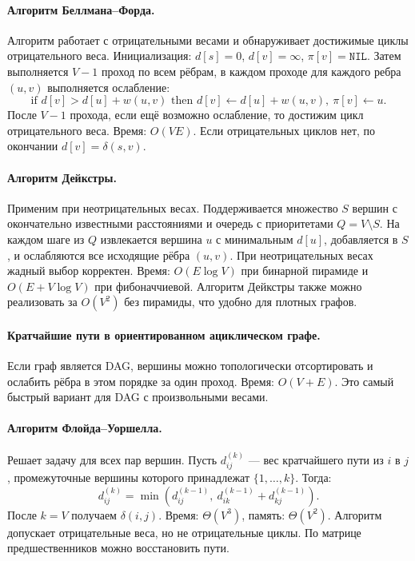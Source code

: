 \documentclass[a4paper,12pt]{article}
\begin{document}
\paragraph*{Алгоритм Беллмана--Форда.}
Алгоритм работает с отрицательными весами и обнаруживает достижимые циклы отрицательного веса. Инициализация: \(d[s]=0\), \(d[v]=\infty\), \(\pi[v]=\texttt{NIL}\). Затем выполняется \(V-1\) проход по всем рёбрам, в каждом проходе для каждого ребра \((u,v)\) выполняется ослабление:
\[
\text{if } d[v]>d[u]+w(u,v)\text{ then } d[v]\leftarrow d[u]+w(u,v),\ \pi[v]\leftarrow u.
\]
После \(V-1\) прохода, если ещё возможно ослабление, то достижим цикл отрицательного веса. Время: \(O(VE)\). Если отрицательных циклов нет, по окончании \(d[v]=\delta(s,v)\).

\paragraph*{Алгоритм Дейкстры.}
Применим при неотрицательных весах. Поддерживается множество \(S\) вершин с окончательно известными расстояниями и очередь с приоритетами \(Q=V\setminus S\). На каждом шаге из \(Q\) извлекается вершина \(u\) с минимальным \(d[u]\), добавляется в \(S\), и ослабляются все исходящие рёбра \((u,v)\). При неотрицательных весах жадный выбор корректен. Время: \(O(E\log V)\) при бинарной пирамиде и \(O(E+V\log V)\) при фибоначчиевой. Алгоритм Дейкстры также можно реализовать за \(O(V^2)\) без пирамиды, что удобно для плотных графов.

\paragraph*{Кратчайшие пути в ориентированном ациклическом графе.}
Если граф является DAG, вершины можно топологически отсортировать и ослабить рёбра в этом порядке за один проход. Время: \(O(V+E)\). Это самый быстрый вариант для DAG с произвольными весами.

\paragraph*{Алгоритм Флойда--Уоршелла.}
Решает задачу для всех пар вершин. Пусть \(d^{(k)}_{ij}\) — вес кратчайшего пути из \(i\) в \(j\), промежуточные вершины которого принадлежат \(\{1,\dots,k\}\). Тогда:
\[
d^{(k)}_{ij}=\min\left(d^{(k-1)}_{ij},\ d^{(k-1)}_{ik}+d^{(k-1)}_{kj}\right).
\]
После \(k=V\) получаем \(\delta(i,j)\). Время: \(\Theta(V^3)\), память: \(\Theta(V^2)\). Алгоритм допускает отрицательные веса, но не отрицательные циклы. По матрице предшественников можно восстановить пути.
\end{document}
